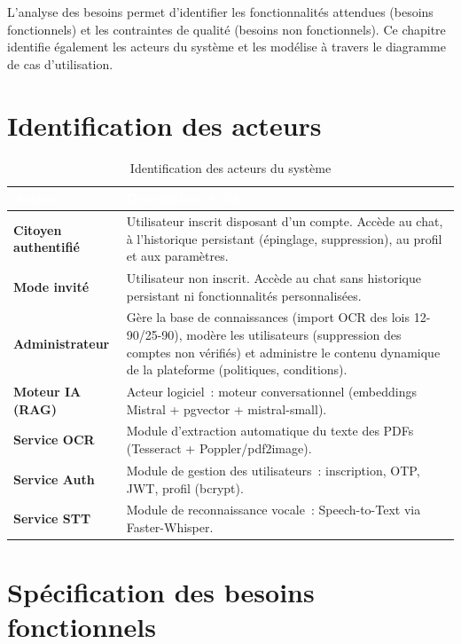 \documentclass[12pt,a4paper]{report}
\begin{document}
L'analyse des besoins permet d'identifier les fonctionnalités attendues (besoins fonctionnels) et les contraintes de qualité (besoins non fonctionnels). Ce chapitre identifie également les acteurs du système et les modélise à travers le diagramme de cas d'utilisation.

\section{Identification des acteurs}

\begin{table}[H]
\centering
\caption{Identification des acteurs du système}
\label{tab:acteurs}
\renewcommand{\arraystretch}{1.35}
\begin{tabularx}{\linewidth}{>{\bfseries\small}p{3.8cm} X}
\arrayrulecolor{darkblue}\hline
\rowcolor{tableheader}\textcolor{white}{\textbf{Acteur}} & \textcolor{white}{\textbf{Description et rôle}} \\
\hline
\rowcolor{tableroweven}
Citoyen authentifié & Utilisateur inscrit disposant d'un compte. Accède au chat, à l'historique persistant (épinglage, suppression), au profil et aux paramètres. \\
\hline
\rowcolor{tablerowodd}
Mode invité & Utilisateur non inscrit. Accède au chat sans historique persistant ni fonctionnalités personnalisées. \\
\hline
\rowcolor{tableroweven}
Administrateur & Gère la base de connaissances (import OCR des lois 12-90/25-90), modère les utilisateurs (suppression des comptes non vérifiés) et administre le contenu dynamique de la plateforme (politiques, conditions). \\
\hline
\rowcolor{tablerowodd}
Moteur IA (RAG) & Acteur logiciel~: moteur conversationnel (embeddings Mistral + pgvector + mistral-small). \\
\hline
\rowcolor{tableroweven}
Service OCR & Module d'extraction automatique du texte des PDFs (Tesseract + Poppler/pdf2image). \\
\hline
\rowcolor{tablerowodd}
Service Auth & Module de gestion des utilisateurs~: inscription, OTP, JWT, profil (bcrypt). \\
\hline
\rowcolor{tableroweven}
Service STT & Module de reconnaissance vocale~: Speech-to-Text via Faster-Whisper. \\
\hline
\end{tabularx}
\end{table}

\section{Spécification des besoins fonctionnels}
\end{document}
